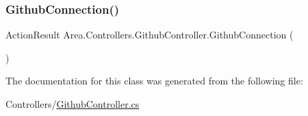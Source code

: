 \subsubsection{\texorpdfstring{Github\+Connection()}{GithubConnection()}}
{\footnotesize\ttfamily Action\+Result Area.\+Controllers.\+Github\+Controller.\+Github\+Connection (\begin{DoxyParamCaption}{ }\end{DoxyParamCaption})\hspace{0.3cm}{\ttfamily [inline]}}



The documentation for this class was generated from the following file\+:\begin{DoxyCompactItemize}
\item 
Controllers/\mbox{\hyperlink{GithubController_8cs}{Github\+Controller.\+cs}}\end{DoxyCompactItemize}
